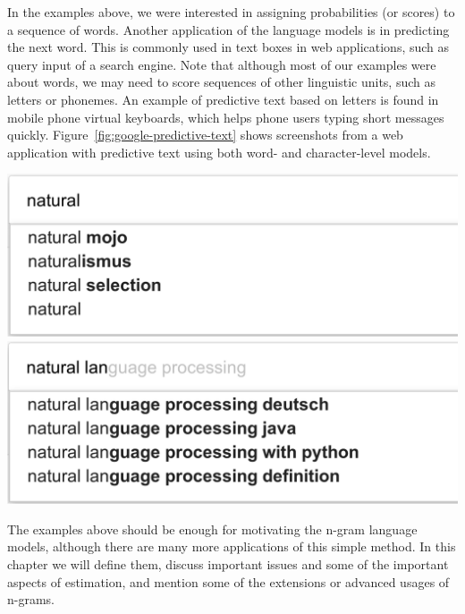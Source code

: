 In the examples above,
we were interested in assigning probabilities (or scores) to a sequence of words.
Another application of the language models is in predicting the next word.
This is commonly used in text boxes in web applications,
such as query input of a search engine.
Note that although most of our examples were about words,
we may need to score sequences of other linguistic units,
such as letters or phonemes.
An example of predictive text based on letters is found
in mobile phone virtual keyboards,
which helps phone users typing short messages quickly.
Figure~\ref{fig:google-predictive-text} shows screenshots
from a web application with predictive text
using both word- and character-level models.
\begin{marginfigure}
  \includegraphics[width=\textwidth]{figures/google-predictive-text-1.png}\\
  \includegraphics[width=\textwidth]{figures/google-predictive-text-2.png}
  \caption{\label{fig:google-predictive-text}%
    Predictive text on a web search engine in two steps (from google.com).
    Although we do not know exact nature of the language models Google uses,
    n-gram language models we discuss here are definitely a good guess.
    Note that there are two different n-grams models are in action here.
    One predicting the next words based on the previous words,
    and another one predicting the (remaining) characters
    in the word being typed,
    based on previous characters.
  }
\end{marginfigure}

The examples above should be enough for motivating
the n-gram language models,
although there are many more applications of this simple method.
In this chapter we will define them,
discuss important issues and some of the important aspects of estimation,
and mention some of the extensions or advanced usages of n-grams.

